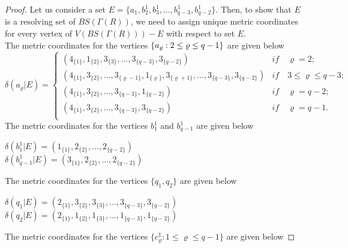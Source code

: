 \documentclass[]{interact}
\theoremstyle{plain}%
\theoremstyle{definition}
\theoremstyle{remark}
\begin{document}
\begin{proof}
\noindent Let us consider a set $E=\{a_1,b^1_2,b^1_3,\ldots, b^1_{q-3},b^1_{q-2}\}$. Then, to show that $E$  is a resolving set of $BS(\Gamma(R))$, we need to assign unique metric coordinates for every vertex of $V(BS(\Gamma(R)))-E$ with respect to set $E$. \\
 The metric coordinates for the vertices $\{a_ \varrho:2\leq \noindent \varrho\leq q-1\}$ are given below
 \begin{equation*}
               \delta(a_{\varrho}|E)=
                   \begin{cases}
                   (4_{\{1\}},1_{\{2 \}},3_{\{3\}},\ldots,3_{\{q-3\}},3_{\{q-2\}}) & \textit{if} \quad \varrho =2 ;\\
                   (4_{\{1\}},3_{\{2\}},\ldots,3_{\{\varrho -1\}},1_{\{ \varrho \}},3_{\{\varrho +1\}},\ldots,3_{\{q-3\}},3_{\{q-2\}}) & \textit{if} \quad 3 \leq \varrho \leq q-3  ;\\
                    (4_{\{1\}},3_{\{2\}},\ldots,3_{\{q-3\}},1_{\{q-2\}}) & \textit{if} \quad \varrho =q-2  ;\\
                    (4_{\{1\}},3_{\{2\}},\ldots,3_{\{q-3\}},3_{\{q-2\}}) & \textit{if}\quad \varrho= q-1.\\
                    \end{cases}
                     \end{equation*}
                     \noindent The metric coordinates for the vertices 
                     \noindent$b^1_1$ and $b^1_{q-1}$  are given below
                     \begin{center}
                          ${\delta(b^1_{1}|E)= (1_{\{ 1\}},2_{\{2\}},\ldots,2_{\{q-2\}}) }$\\
                   \noindent${\delta(b^1_{q-1}|E)= (3_{\{1\}},2_{\{2\}},\ldots,2_{\{q-2\}})}$ \\
                     \end{center}
                     \noindent The metric coordinates for the vertices 
                     $\{q_1,q_2\}$ are given below
                     \begin{center}
\noindent $\delta(q_1|E)=(2_{\{1\}},3_{\{2\}},3_{\{3\}},\ldots,3_{\{q-3\}},3_{\{q-2\}})$\\
\noindent $ \delta(q_2|E)=(2_{\{1\}},1_{\{2\}},1_{\{3\}},\ldots,1_{\{q-3\}},1_{\{q-2\}})$\\
\end{center}
\noindent The metric coordinates for the vertices 
                     $\{c^{1}_{\varrho}:1\leq \varrho\leq q-1\}$ are given below

\end{proof}
\end{document}
